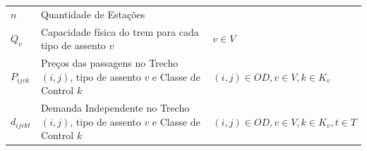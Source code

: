 \begin{table}[H]
\begin{tabular}{p{2cm} p{9.5cm} p{3.2cm}}
		$n$                & Quantidade de Estações                                                                                                                                                                                                                                                                                                                                                                                                        &                                              \\
		$Q_v$              & Capacidade física do trem para cada tipo de assento $v$                                                                                                                                                                                                                                                                                                                                                                         & $v \in V$                                    \\
		$P_{ijvk}$         & Preços  das passagens no Trecho $(i,j)$, tipo de assento $v$ e Classe de Control $k$                                                                                                                                                                                                                                                                                                                                                    & $(i,j) \in OD,v \in V, k \in K_v$            \\
		$d_{ijvkt}$        & Demanda Independente no Trecho $(i,j)$, tipo de assento $v$ e Classe de Control $k$                                                                                                                                                                                                                                                                                                                                                   & $(i,j) \in OD,v \in V, k \in K_v, t \in T$   \\ \midrule

\end{tabular}
\end{table}
